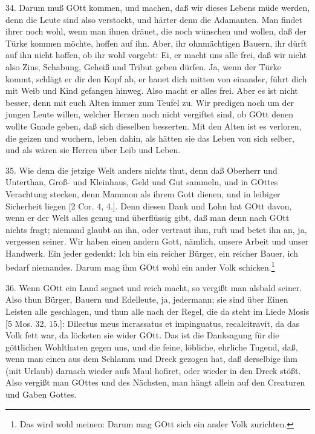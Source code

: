 34. Darum muß GOtt kommen, und machen, daß wir dieses Lebens müde werden, denn die Leute sind also verstockt, und härter denn die Adamanten. Man findet ihrer noch wohl, wenn man ihnen dräuet, die noch wünschen und wollen, daß der Türke kommen möchte, hoffen auf ihn. Aber, ihr ohnmächtigen Bauern, ihr dürft auf ihn nicht hoffen, ob ihr wohl vorgebt: Ei, er macht uns alle frei, daß wir nicht also Zins, Schabung, Geheiß und Tribut geben dürfen. Ja, wenn der Türke kommt, schlägt er dir den Kopf ab, er hauet dich mitten von einander, führt dich mit Weib und Kind gefangen hinweg. Also macht er alles frei. Aber es ist nicht besser, denn mit euch Alten immer zum Teufel zu. Wir predigen noch um der jungen Leute willen, welcher Herzen noch nicht vergiftet sind, ob GOtt denen wollte Gnade geben, daß sich dieselben besserten. Mit den Alten ist es verloren, die geizen und wuchern, leben dahin, als hätten sie das Leben von sich selber, und als wären sie Herren über Leib und Leben.

35. Wie denn die jetzige Welt anders nichts thut, denn daß Oberherr und Unterthan, Groß- und Kleinhaus, Geld und Gut sammeln, und in GOttes Verachtung stecken, denn Mammon als ihrem Gott dienen, und in leibiger Sicherheit liegen [2 Cor. 4, 4.]. Denn diesen Dank und Lohn hat GOtt davon, wenn er der Welt alles genug und überflüssig gibt, daß man denn nach GOtt nichts fragt; niemand glaubt an ihn, oder vertraut ihm, ruft und betet ihn an, ja, vergessen seiner. Wir haben einen andern Gott, nämlich, unsere Arbeit und unser Handwerk. Ein jeder gedenkt: Ich bin ein reicher Bürger, ein reicher Bauer, ich bedarf niemandes. Darum mag ihm GOtt wohl ein ander Volk schicken.\footnote{Das wird wohl meinen: Darum mag GOtt sich ein ander Volk zurichten.}

36. Wenn GOtt ein Land segnet und reich macht, so vergißt man alsbald seiner. Also thun Bürger, Bauern und Edelleute, ja, jedermann; sie sind über Einen Leisten alle geschlagen, und thun alle nach der Regel, die da steht im Liede Mosis [5 Mos. 32, 15.]: Dilectus meus incrassatus et impinguatus, recalcitravit, da das Volk fett war, da löcketen sie wider GOtt. Das ist die
Danksagung für die göttlichen Wohlthaten gegen uns, und die feine, löbliche, ehrliche Tugend, daß, wenn man einen aus dem Schlamm und Dreck gezogen hat, daß derselbige ihm (mit Urlaub) darnach wieder aufs Maul hofiret, oder wieder in den Dreck stößt. Also vergißt man GOttes und des Nächsten, man hängt allein auf den Creaturen und Gaben Gottes.

